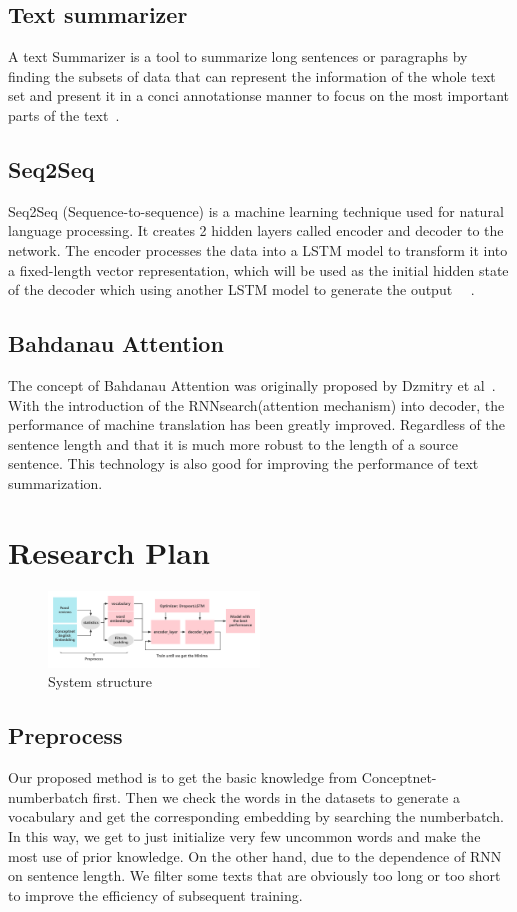 \documentclass[conference]{IEEEtran}
\begin{document}
\subsection{Text summarizer}
A text Summarizer is a tool to summarize long sentences or paragraphs by finding the subsets of data that can represent the information of the whole text set and present it in a conci annotationse manner to focus on the most important parts of the text~\cite{sinha2018extractive}. 
\subsection{Seq2Seq}
Seq2Seq (Sequence-to-sequence) is a machine learning technique used for natural language processing. It creates 2 hidden layers called encoder and decoder to the network. The encoder processes the data into a LSTM model to transform it into a fixed-length vector representation, which will be used as the initial hidden state of the decoder which using another LSTM model to generate the output ~\cite{sutskever2014sequence}~\cite{vinyals2015show}. 
\subsection{Bahdanau Attention}
The concept of Bahdanau Attention was originally proposed by Dzmitry et al~\cite{bahdanau2014neural}. With the introduction of the RNNsearch(attention mechanism) into decoder, the performance of machine translation has been greatly improved. Regardless of the sentence length and that it is much more robust to the length of a source sentence. This technology is also good for improving the performance of text summarization. 

\section{Research Plan}
\begin{figure}[h]
\centering
\includegraphics[width=0.5\textwidth]{imgs/System_Structure.png}
\caption{System structure}
\label{fig:System_Structure}
\end{figure}
\subsection{Preprocess}
Our proposed method is to get the basic knowledge from Conceptnet-numberbatch first. Then we check the words in the datasets to generate a vocabulary and get the corresponding embedding by searching the numberbatch. In this way, we get to just initialize very few uncommon words and make the most use of prior knowledge. On the other hand, due to the dependence of RNN on sentence length. We filter some texts that are obviously too long or too short to improve the efficiency of subsequent training. 
\end{document}
